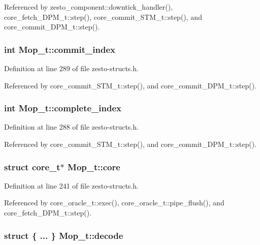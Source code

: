 Referenced by zesto\_\-component::downtick\_\-handler(), core\_\-fetch\_\-DPM\_\-t::step(), core\_\-commit\_\-STM\_\-t::step(), and core\_\-commit\_\-DPM\_\-t::step().
\subsubsection[{commit\_\-index}]{\setlength{\rightskip}{0pt plus 5cm}int {\bf Mop\_\-t::commit\_\-index}}\label{structMop__t_2e86bc0a7037dfc0948a3dc895f02735}




Definition at line 289 of file zesto-structs.h.

Referenced by core\_\-commit\_\-STM\_\-t::step(), and core\_\-commit\_\-DPM\_\-t::step().
\subsubsection[{complete\_\-index}]{\setlength{\rightskip}{0pt plus 5cm}int {\bf Mop\_\-t::complete\_\-index}}\label{structMop__t_bf12e6ea4212ed366a436c76d7b72fad}




Definition at line 288 of file zesto-structs.h.

Referenced by core\_\-commit\_\-STM\_\-t::step(), and core\_\-commit\_\-DPM\_\-t::step().
\subsubsection[{core}]{\setlength{\rightskip}{0pt plus 5cm}struct {\bf core\_\-t}$\ast$ {\bf Mop\_\-t::core}\hspace{0.3cm}{\tt  [read]}}\label{structMop__t_2ab1350e46f43d1327adc1457ac77372}




Definition at line 241 of file zesto-structs.h.

Referenced by core\_\-oracle\_\-t::exec(), core\_\-oracle\_\-t::pipe\_\-flush(), and core\_\-fetch\_\-DPM\_\-t::step().
\subsubsection[{decode}]{\setlength{\rightskip}{0pt plus 5cm}struct \{ ... \}   {\bf Mop\_\-t::decode}}\label{structMop__t_28058bfb31dd9263c008929f3c4f7f08}




